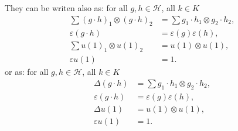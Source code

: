 \documentclass[a4paper]{article}
\begin{document}
They can be writen also as: for all $g, h \in \mathcal{H}$, all $k \in K$
\begin{align*}
\sum (g \cdot h)_1 \otimes (g \cdot h)_2 &= \sum g_1 \cdot h_1 \otimes g_2 \cdot h_2, \\
\varepsilon(g \cdot h) &= \varepsilon(g)\varepsilon(h), \\
\sum u(1)_1 \otimes u(1)_2 &= u(1) \otimes u(1), \\
\varepsilon u(1) &= 1.
\end{align*}
or as: for all $g, h \in \mathcal{H}$, all $k \in K$
\begin{align*}
\Delta(g \cdot h) &= \sum g_1 \cdot h_1 \otimes g_2 \cdot h_2, \\
\varepsilon(g \cdot h) &= \varepsilon(g)\varepsilon(h), \\
\Delta u(1) &= u(1) \otimes u(1), \\
\varepsilon u(1) &= 1.
\end{align*}
{}

\end{document}
